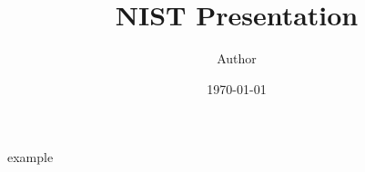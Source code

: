 \documentclass[aspectratio=169]{beamer}
\title{NIST Presentation}
\author[Author]{Author}
\date[\today]{\today}
\begin{document}
  \titleslide

  \overviewslide

  {example}


  \bibliographyslide
\end{document}
